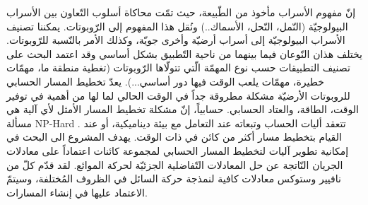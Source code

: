 إنّ مفهوم الأسراب مأخوذ من الطّبيعة، حيث تمّت محاكاة أسلوب التّعاون بين الأسراب البيولوجيّة (النّمل، النّحل، الأسماك..) ونُقل هذا المفهوم إلى الرّوبوتات. يمكننا تصنيف الأسراب البيولوجيّة إلى أسراب أرضيّة وأخرى جويّة، وكذلك الأمر بالنّسبة للرّوبوتات. يختلف هذان النّوعان فيما بينهما من ناحية التّطبيق بشكل أساسي وقد اعتمد البحث \cite{b1} على تصنيف التطبيقات حسب نوع المهمّة الّتي تتولّاها الرّوبوتات (تغطية منطقة ما، مهمّات خطيرة، مهمّات يلعب الوقت فيها دور أساسي...).
يعدّ تخطيط المسار الحسابي للروبوتات الأرضيّة مشكلة مطروقة جداً في الوقت الحالي لما لها من أهمية في توفير الوقت، الطاقة، والعتاد الحسابي. حسابياً، إنّ مشكلة تخطيط المسار الأمثل لأي آلية هي مسألة \textenglish{NP-Hard} \cite{b2,b3}. تتعقد أليات الحساب وتبعاته عند التعامل مع بيئة ديناميكية، أو عند القيام بتخطيط مسار أكثر من كائن في ذات الوقت.
يهدف المشروع الى البحث في إمكانية تطوير آليات لتخطيط المسار الحسابي لمجموعة كائنات اعتماداً على معادلات الجريان النّاتجة عن حل المعادلات التّفاضلية الجزئيّة لحركة الموائع. لقد قدّم كلّ من نافيير وستوكس معادلات كافية لنمذجة حركة السائل في الظروف المُختلفة، وسيتمّ الاعتماد عليها في إنشاء المسارات.
